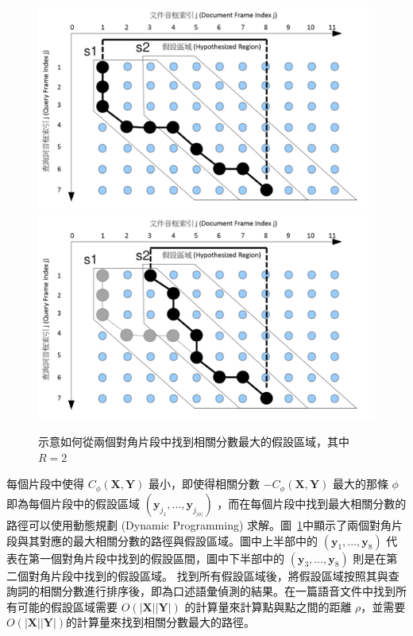 \begin{figure}[h]
\centering
\includegraphics[scale=0.4]{images/chap2_segdtw_exp1.png}
\includegraphics[scale=0.4]{images/chap2_segdtw_exp2.png}
\caption{示意如何從兩個對角片段中找到相關分數最大的假設區域，其中 $R=2$}
\label{fig:chap2_sdtw_exp}
\end{figure}




每個片段中使得 $C_{\phi}(\mathbf{X}, \mathbf{Y})$ 最小，即使得相關分數 $-C_{\phi}(\mathbf{X}, \mathbf{Y})$ 最大的那條 $\phi$ 即為每個片段中的假設區域 $(\mathbf{y}_{j_1},...,\mathbf{y}_{j_{|\phi|}})$ ，而在每個片段中找到最大相關分數的路徑可以使用動態規劃 (Dynamic Programming) 求解。圖~\ref{fig:chap2_sdtw_exp}中顯示了兩個對角片段與其對應的最大相關分數的路徑與假設區域。圖中上半部中的 $(\mathbf{y}_1, ..., \mathbf{y}_8)$ 代表在第一個對角片段中找到的假設區間，圖中下半部中的 $(\mathbf{y}_3, ..., \mathbf{y}_8)$ 則是在第二個對角片段中找到的假設區域。 找到所有假設區域後，將假設區域按照其與查詢詞的相關分數進行排序後，即為口述語彙偵測的結果。在一篇語音文件中找到所有可能的假設區域需要 $O(|\mathbf{X}||\mathbf{Y}|)$ 的計算量來計算點與點之間的距離 $\rho$，並需要$O(|\mathbf{X}||\mathbf{Y}|)$的計算量來找到相關分數最大的路徑。

